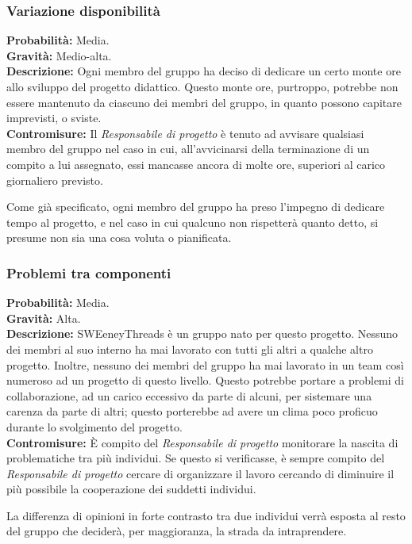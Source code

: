\documentclass[a4paper]{article}
\begin{document}
			\subsubsection{Variazione disponibilità}
				\textbf{Probabilità:} Media.
				\\ 
				\textbf{Gravità:} Medio-alta.
				\\ 
				\textbf{Descrizione:} Ogni membro del gruppo ha deciso di dedicare un certo monte ore allo sviluppo del 
					progetto didattico. Questo monte ore, purtroppo, potrebbe non essere mantenuto da 
					ciascuno dei membri del gruppo, in quanto possono capitare imprevisti, o sviste.
				\\ 
				\textbf{Contromisure:} Il \emph{Responsabile di progetto} è tenuto ad avvisare qualsiasi membro del gruppo 
					nel caso in cui, all'avvicinarsi della terminazione di un compito a lui assegnato, 
					essi mancasse ancora di molte ore, superiori al carico giornaliero previsto. 
					
					Come già specificato, ogni membro del gruppo ha preso l'impegno di dedicare tempo 
					al progetto, e nel caso in cui qualcuno non rispetterà quanto detto, si presume 
					non sia una cosa voluta o pianificata.
			\subsubsection{Problemi tra componenti}
				\textbf{Probabilità:} Media.
				\\ 
				\textbf{Gravità:} Alta.
				\\ 
				\textbf{Descrizione:} SWEeneyThreads è un gruppo nato per questo progetto. Nessuno dei membri al suo interno 
					ha mai lavorato con tutti gli altri a qualche altro progetto. Inoltre, nessuno dei membri 
					del gruppo ha mai lavorato in un team così numeroso ad un progetto di questo livello. 
					Questo potrebbe portare a problemi di collaborazione, ad un carico eccessivo da parte di 
					alcuni, per sistemare una carenza da parte di altri; questo porterebbe ad avere un clima 
					poco proficuo durante lo svolgimento del progetto.
				\\ 
				\textbf{Contromisure:} È compito del \emph{Responsabile di progetto} monitorare la nascita di problematiche tra più 
					individui. Se questo si verificasse, è sempre compito del \emph{Responsabile di progetto} 
					cercare di organizzare il lavoro cercando di diminuire il più possibile la cooperazione 
					dei suddetti individui. 
					
					La differenza di opinioni in forte contrasto tra due individui verrà esposta al resto del 
					gruppo che deciderà, per maggioranza, la strada da intraprendere.
\end{document}
